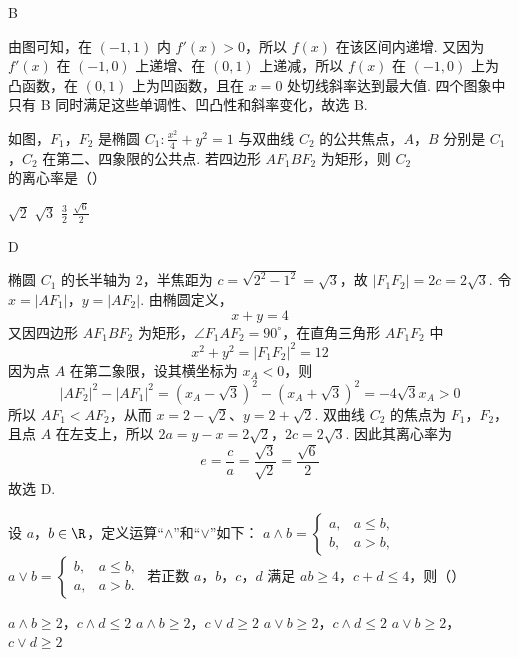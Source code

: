 \begin{answer}
B
\end{answer}

\begin{solution}
由图可知，在 \((-1,1)\) 内 \(f'(x)>0\)，所以 \(f(x)\) 在该区间内递增. 又因为 \(f'(x)\) 在 \((-1,0)\) 上递增、在 \((0,1)\) 上递减，所以 \(f(x)\) 在 \((-1,0)\) 上为凸函数，在 \((0,1)\) 上为凹函数，且在 \(x=0\) 处切线斜率达到最大值. 四个图象中只有 B 同时满足这些单调性、凹凸性和斜率变化，故选 B.
\end{solution}

\begin{problem}
如图，\(F_{1}\)，\(F_{2}\) 是椭圆 \(C_{1}: \frac{x^{2}}{4} + y^{2} = 1\) 与双曲线 \(C_{2}\) 的公共焦点，\(A\)，\(B\) 分别是 \(C_{1}\)，\(C_{2}\) 在第二、四象限的公共点. 若四边形 \(AF_{1}BF_{2}\) 为矩形，则 \(C_{2}\) 的离心率是（\quad）


\choices
    {\(\sqrt{2}\)}
    {\(\sqrt{3}\)}
    {\( \frac{3}{2} \)}
    {\(\frac{\sqrt{6}}{2}\)}

\end{problem}

\begin{answer}
D
\end{answer}

\begin{solution}
椭圆 \(C_1\) 的长半轴为 \(2\)，半焦距为
\(c=\sqrt{2^2-1^2}=\sqrt3\)，故 \(|F_1F_2|=2c=2\sqrt3\). 令
\(x=|AF_1|\)，\(y=|AF_2|\). 由椭圆定义，
\[
x+y=4
\]
又因四边形 \(AF_1BF_2\) 为矩形，\(\angle F_1AF_2=90^\circ\)，在直角三角形 \(AF_1F_2\) 中
\[
x^2+y^2=|F_1F_2|^2=12
\]
因为点 \(A\) 在第二象限，设其横坐标为 \(x_A<0\)，则
\[
|AF_2|^2-|AF_1|^2=(x_A-\sqrt3)^2-(x_A+\sqrt3)^2=-4\sqrt3 x_A>0
\]
所以 \(AF_1<AF_2\)，从而 \(x=2-\sqrt2\)、\(y=2+\sqrt2\). 双曲线 \(C_2\) 的焦点为 \(F_1\)，\(F_2\)，且点 \(A\) 在左支上，所以
\(2a=y-x=2\sqrt2\)，\(2c=2\sqrt3\).
因此其离心率为
\[
e=\frac{c}{a}=\frac{\sqrt3}{\sqrt2}=\frac{\sqrt6}{2}
\]
故选 D.
\end{solution}

\begin{problem}
设 \(a\)，\(b \in \R\)，定义运算“\(\wedge\)”和“\(\vee\)”如下：
\(a \wedge b = \begin{cases}
a, & a \leqslant b,\\
b, & a > b,
\end{cases}\)
\(a \vee b = \begin{cases}
b, & a \leqslant b,\\
a, & a > b.
\end{cases}\) 若正数 \(a\)，\(b\)，\(c\)，\(d\) 满足 \(ab \geqslant 4\)，\(c + d \leqslant 4\)，则（\quad）

\choices
    {\(a \wedge b \geqslant 2\)，\(c \wedge d \leqslant 2\)}
    {\(a \wedge b \geqslant 2\)，\(c \vee d \geqslant 2\)}
    {\(a \vee b \geqslant 2\)，\(c \wedge d \leqslant 2\)}
    {\(a \vee b \geqslant 2\)，\(c \vee d \geqslant 2\)}

\end{problem}

